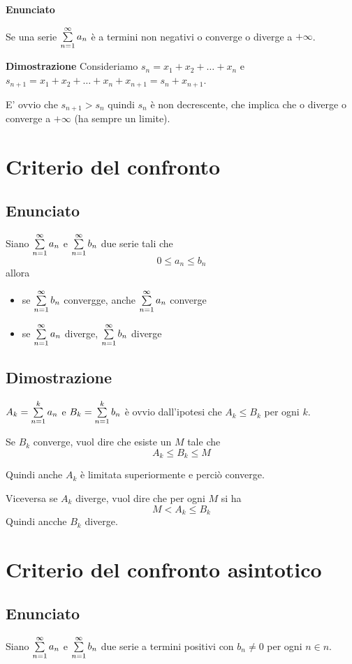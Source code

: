 \textbf{Enunciato}

Se una serie $\sum\limits_{n=1}^{\infty}a_n$  è a termini non negativi o converge o diverge a $+\infty$.

\textbf{Dimostrazione}
Consideriamo $s_n = x_1 + x_2 + \ldots + x_n$ e $s_{n+1} = x_1 + x_2 + \ldots + x_n + x_{n+1} = s_n + x_{n+1}$. 

E' ovvio che $s_{n+1}>s_n$ quindi $s_n$ è non decrescente, che implica che o diverge o converge a $+\infty$ (ha sempre un limite).

\section{Criterio del confronto}

\subsection{Enunciato}
Siano $\sum\limits_{n=1}^{\infty}a_n$ e $\sum\limits_{n=1}^{\infty}b_n$ due serie tali che $$0 \leq a_n \leq b_n$$ allora

\begin{itemize}
\item se $\sum\limits_{n=1}^{\infty}b_n$ convergge, anche $\sum\limits_{n=1}^{\infty}a_n$ converge
\item se $\sum\limits_{n=1}^{\infty}a_n$ diverge, $\sum\limits_{n=1}^{\infty}b_n$ diverge
\end{itemize}

\subsection{Dimostrazione}
$A_k = \sum\limits_{n=1}^{k}a_n$ e $B_k = \sum\limits_{n=1}^{k}b_n$ è ovvio dall'ipotesi che $A_k \leq B_k$ per ogni $k$. 

Se $B_k$ converge, vuol dire che esiste un $M$ tale che $$A_k \leq B_k \leq M$$

Quindi anche $A_k$ è limitata superiormente e perciò converge. 

Viceversa se $A_k$ diverge, vuol dire che per ogni $M$ si ha $$M < A_k \leq B_k$$ Quindi ancche $B_k$ diverge.

\section{Criterio del confronto asintotico}

\subsection{Enunciato}
Siano $\sum\limits_{n=1}^{\infty}a_n$ e $\sum\limits_{n=1}^{\infty}b_n$ due serie a termini positivi con $b_{n} \neq 0$ per ogni $n \in n$.

